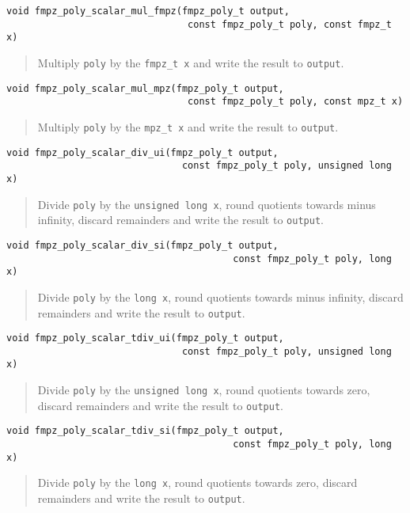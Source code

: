 \documentclass[a4paper,10pt]{article}
\newcommand{\code}{\lstinline}
\begin{document}
\begin{lstlisting}
void fmpz_poly_scalar_mul_fmpz(fmpz_poly_t output, 
                                const fmpz_poly_t poly, const fmpz_t x) 
\end{lstlisting}
\begin{quote}
Multiply \code{poly} by the \code{fmpz_t x} and write the result to \code{output}. 
\end{quote}

\begin{lstlisting}
void fmpz_poly_scalar_mul_mpz(fmpz_poly_t output, 
                                const fmpz_poly_t poly, const mpz_t x) 
\end{lstlisting}
\begin{quote}
Multiply \code{poly} by the \code{mpz_t x} and write the result to \code{output}. 
\end{quote}

\begin{lstlisting}
void fmpz_poly_scalar_div_ui(fmpz_poly_t output, 
                               const fmpz_poly_t poly, unsigned long x)
\end{lstlisting}
\begin{quote}
Divide \code{poly} by the \code{unsigned long x}, round quotients towards minus infinity, discard remainders and write the result to \code{output}. 
\end{quote}

\begin{lstlisting}
void fmpz_poly_scalar_div_si(fmpz_poly_t output, 
                                        const fmpz_poly_t poly, long x)
\end{lstlisting}
\begin{quote}
Divide \code{poly} by the \code{long x}, round quotients towards minus infinity, discard remainders and write the result to \code{output}.
\end{quote}

\begin{lstlisting}
void fmpz_poly_scalar_tdiv_ui(fmpz_poly_t output, 
                               const fmpz_poly_t poly, unsigned long x)
\end{lstlisting}
\begin{quote}
Divide \code{poly} by the \code{unsigned long x}, round quotients towards zero, discard remainders and write the result to \code{output}.
\end{quote}

\begin{lstlisting}
void fmpz_poly_scalar_tdiv_si(fmpz_poly_t output, 
                                        const fmpz_poly_t poly, long x)
\end{lstlisting}
\begin{quote}
Divide \code{poly} by the \code{long x}, round quotients towards zero, discard remainders and write the result to \code{output}.
\end{quote}
\end{document}
